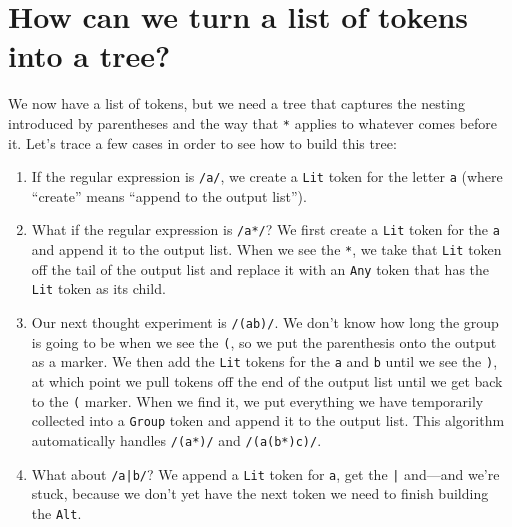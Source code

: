 \documentclass[krantzl]{krantz}
\begin{document}
\section{How can we turn a list of tokens into a tree?}\label{regex-parser-tree}


We now have a list of tokens,
but we need a tree that captures the nesting introduced by parentheses
and the way that \texttt{*} applies to whatever comes before it.
Let’s trace a few cases in order to see how to build this tree:

\begin{enumerate}

\item 

If the regular expression is \texttt{/a/}, we create a \texttt{Lit} token for the letter \texttt{a}
    (where “create” means “append to the output list”).



\item 

What if the regular expression is \texttt{/a*/}?
    We first create a \texttt{Lit} token for the \texttt{a} and append it to the output list.
    When we see the \texttt{*},
    we take that \texttt{Lit} token off the tail of the output list
    and replace it with an \texttt{Any} token that has the \texttt{Lit} token as its child.



\item 

Our next thought experiment is \texttt{/(ab)/}.
    We don’t know how long the group is going to be when we see the \texttt{(},
    so we put the parenthesis onto the output as a marker.
    We then add the \texttt{Lit} tokens for the \texttt{a} and \texttt{b}
    until we see the \texttt{)},
    at which point we pull tokens off the end of the output list
    until we get back to the \texttt{(} marker.
    When we find it,
    we put everything we have temporarily collected into a \texttt{Group} token and append it to the output list.
    This algorithm automatically handles \texttt{/(a*)/} and \texttt{/(a(b*)c)/}.



\item 

What about \texttt{/a|b/}?
    We append a \texttt{Lit} token for \texttt{a}, get the \texttt{|} and—and we’re stuck,
    because we don’t yet have the next token we need to finish building the \texttt{Alt}.



\end{enumerate}
\end{document}

